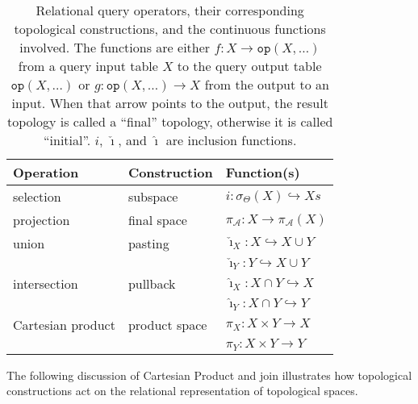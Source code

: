 \documentclass[5p]{elsarticle}
\newcommand{\qq}[1]{``#1''}
\begin{document}
\begin{table}[h]
  \centering
  \begin{tabular}{lll}
    Operation  & Construction & Function(s) \\
    \hline
    selection  & subspace    & $i: \sigma_\Theta(X) \hookrightarrow Xs$\\
    [\jot]
    projection & final space & $\pi_{\mathcal{A}}:X \to \pi_{\mathcal{A}}(X)$\\
    [\jot]
    union      & pasting     & $\check\imath_X:X \hookrightarrow X\cup Y$\\
               &             & $\check\imath_Y:Y \hookrightarrow X\cup Y$\\
    [\jot]
    intersection& pullback   & $\hat\imath_X: X\cap Y \hookrightarrow X $\\
               &             & $\hat\imath_Y: X\cap Y \hookrightarrow Y$\\
    [\jot]
    Cartesian product 
               & product space 
                             & $\pi_X: X\times Y \to X$\\
               &             & $\pi_Y: X\times Y \to Y$
  \end{tabular}
  \caption{Relational query operators, their corresponding topological 
constructions, and the continuous functions involved. The functions are either 
$f:X \to \texttt{op}(X,\dotsc)$ from a query input table $X$ to the query output table 
$\texttt{op}(X,\dotsc)$ or $g:\texttt{op}(X,\dotsc) \to X$ from the output 
to an input. When that arrow points to the output, the result topology 
is called a \qq{final} topology, otherwise it is called \qq{initial}. 
$i$, $\check\imath$, and $\hat\imath$ are inclusion functions.}
  \label{tab:queries}
\end{table}

The following discussion of Cartesian Product and join illustrates 
how topological constructions act on the relational representation of 
topological spaces.
\end{document}

